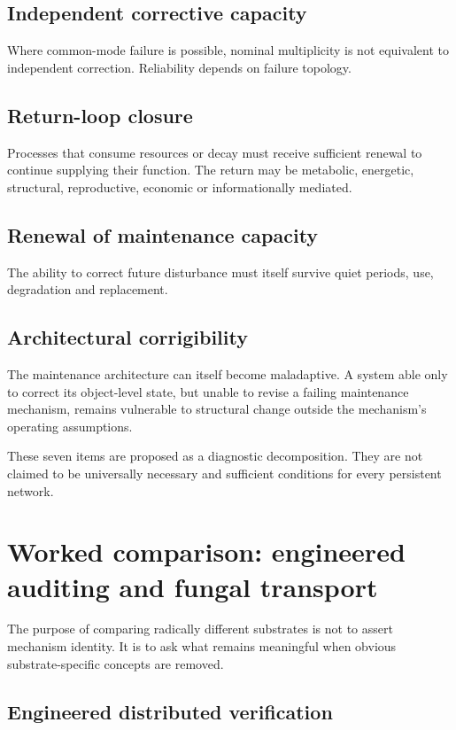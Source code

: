 \subsection{Independent corrective capacity}

Where common-mode failure is possible, nominal multiplicity is not equivalent to independent correction. Reliability depends on failure topology.

\subsection{Return-loop closure}

Processes that consume resources or decay must receive sufficient renewal to continue supplying their function. The return may be metabolic, energetic, structural, reproductive, economic or informationally mediated.

\subsection{Renewal of maintenance capacity}

The ability to correct future disturbance must itself survive quiet periods, use, degradation and replacement.

\subsection{Architectural corrigibility}

The maintenance architecture can itself become maladaptive. A system able only to correct its object-level state, but unable to revise a failing maintenance mechanism, remains vulnerable to structural change outside the mechanism's operating assumptions.

These seven items are proposed as a diagnostic decomposition. They are not claimed to be universally necessary and sufficient conditions for every persistent network.

\section{Worked comparison: engineered auditing and fungal transport}

The purpose of comparing radically different substrates is not to assert mechanism identity. It is to ask what remains meaningful when obvious substrate-specific concepts are removed.

\subsection{Engineered distributed verification}

